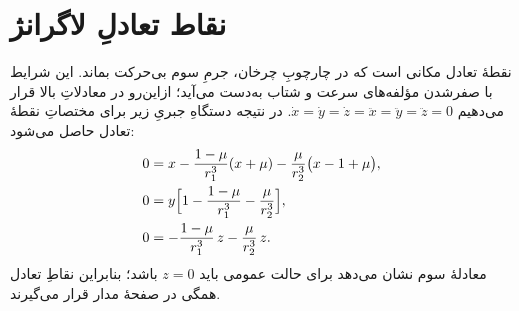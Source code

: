%
%
%
%
%
%
%
%
%
%
%
%









\section{نقاط تعادلِ لاگرانژ}\label{sec:lag-points}

نقطهٔ تعادل مکانی است که در چارچوبِ چرخان، جرمِ سوم بی‌حرکت بماند. این شرایط با صفرشدن مؤلفه‌های سرعت و شتاب به‌دست می‌آید؛ ازاین‌رو در معادلاتِ بالا قرار می‌دهیم $\dot x=\dot y=\dot z=\ddot x=\ddot y=\ddot z=0$. در نتیجه دستگاهِ جبریِ زیر برای مختصاتِ نقطهٔ تعادل حاصل می‌شود:
\begin{align}
	0 &= x-\frac{1-\mu}{r_{1}^{3}}(x+\mu)-\frac{\mu}{r_{2}^{3}}\bigl(x-1+\mu\bigr),\\
	0 &= y\Bigl[1-\frac{1-\mu}{r_{1}^{3}}-\frac{\mu}{r_{2}^{3}}\Bigr],\\
	0 &= -\frac{1-\mu}{r_{1}^{3}}\,z-\frac{\mu}{r_{2}^{3}}\,z.
\end{align}
معادلهٔ سوم نشان می‌دهد برای حالت عمومی باید $z=0$ باشد؛ بنابراین نقاطِ تعادل همگی در صفحهٔ مدار قرار می‌گیرند.

